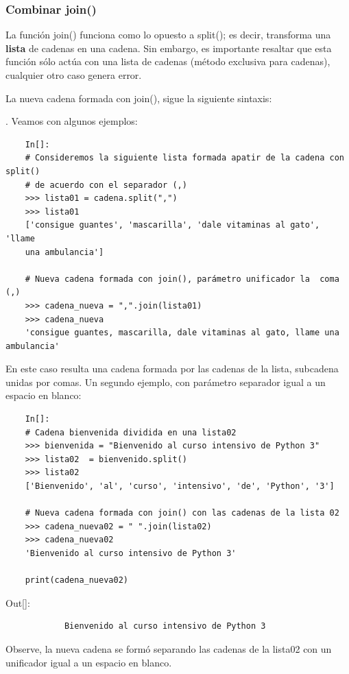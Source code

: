 \subsubsection{Combinar join()}

La función {\ttfamily join()} funciona como lo opuesto a  {\ttfamily split()}; es decir, transforma una {\bf lista} de cadenas en una cadena.  Sin embargo,  es importante resaltar que esta función sólo actúa con una lista de cadenas (método exclusiva para cadenas), cualquier otro caso genera error.

La nueva cadena formada con {\ttfamily join()}, sigue la siguiente sintaxis:

. Veamos con algunos ejemplos:  

\begin{lstlisting}
	In[]:	
	# Consideremos la siguiente lista formada apatir de la cadena con split()
	# de acuerdo con el separador (,)
	>>> lista01 = cadena.split(",")
	>>> lista01
	['consigue guantes', 'mascarilla', 'dale vitaminas al gato', 'llame
	una ambulancia']
	
	# Nueva cadena formada con join(), parámetro unificador la  coma (,)
	>>> cadena_nueva = ",".join(lista01)
	>>> cadena_nueva
	'consigue guantes, mascarilla, dale vitaminas al gato, llame una ambulancia'
\end{lstlisting}


\noindent En este caso resulta una cadena formada por las cadenas de la lista, subcadena unidas por comas. Un segundo ejemplo, con parámetro separador igual a un espacio en blanco:

\begin{lstlisting}
	In[]:	
	# Cadena bienvenida	dividida en una lista02
	>>> bienvenida = "Bienvenido al curso intensivo de Python 3"	
	>>> lista02  = bienvenido.split()
	>>> lista02
	['Bienvenido', 'al', 'curso', 'intensivo', 'de', 'Python', '3']
	
	# Nueva cadena formada con join() con las cadenas de la lista 02
	>>> cadena_nueva02 = " ".join(lista02)
	>>> cadena_nueva02
	'Bienvenido al curso intensivo de Python 3'
	
	print(cadena_nueva02)
\end{lstlisting}

{\ttfamily\scriptsize\scriptsize 
	\hspace{-0.65cm}Out[]:\vspace{-0.3cm}	
	
	{\color{blue} 	
		\begin{verbatim}
			Bienvenido al curso intensivo de Python 3	
		\end{verbatim}
}}
\noindent Observe, la nueva cadena se formó separando las cadenas de la lista02 con un unificador igual a un 
espacio en blanco.\\

